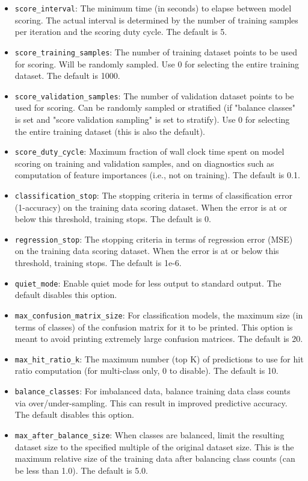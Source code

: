 \documentclass[12pt]{article}
\begin{document}
\begin{itemize}
\item \texttt{score\_interval}: The minimum time (in seconds) to elapse between model scoring. The actual interval is determined by the number of training samples per iteration and the scoring duty cycle. The default is 5. 
\item \texttt{score\_training\_samples}: The number of training dataset points to be used for scoring. Will be randomly sampled. Use 0 for selecting the entire training dataset. The default is 1000.
\item \texttt{score\_validation\_samples}: The number of validation dataset points to be used for scoring. Can be randomly sampled or stratified (if "balance classes" is set and "score validation sampling" is set to stratify). Use 0 for selecting the entire training dataset (this is also the default).
\item \texttt{score\_duty\_cycle}: Maximum fraction of wall clock time spent on model scoring on training and validation samples, and on diagnostics such as computation of feature importances (i.e., not on training). The default is 0.1.
\item \texttt{classification\_stop}: The stopping criteria in terms of classification error (1-accuracy) on the training data scoring dataset. When the error is at or below this threshold, training stops. The default is 0.
\item \texttt{regression\_stop}: The stopping criteria in terms of regression error (MSE) on the training data scoring dataset. When the error is at or below this threshold, training stops. The default is 1e-6. 
\item \texttt{quiet\_mode}: Enable quiet mode for less output to standard output. The default disables this option.
\item \texttt{max\_confusion\_matrix\_size}: For classification models, the maximum size (in terms of classes) of the confusion matrix for it to be printed. This option is meant to avoid printing extremely large confusion matrices. The default is 20.
\item \texttt{max\_hit\_ratio\_k}: The maximum number (top K) of predictions to use for hit ratio computation (for multi-class only, 0 to disable). The default is 10.
\item \texttt{balance\_classes}: For imbalanced data, balance training data class counts via over/under-sampling. This can result in improved predictive accuracy. The default disables this option. 
\item \texttt{max\_after\_balance\_size}: When classes are balanced, limit the resulting dataset size to the specified multiple of the original dataset size. This is the maximum relative size of the training data after balancing class counts (can be less than 1.0). The default is 5.0.

\end{itemize}
\end{document}
